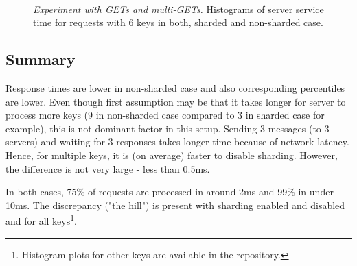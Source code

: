 \documentclass[11pt,a4paper]{article}
\begin{document}
\begin{figure}[ht!]
	\centering	
	\hfill
	\\
	\caption{\textit{Experiment with GETs and multi-GETs.} Histograms of server service time for requests with 6 keys in both, sharded and non-sharded case.}
	\label{Figure:histograms_sst}	
\end{figure}

\subsection{Summary}

Response times are lower in non-sharded case and also corresponding percentiles are lower. Even though first assumption may be that it takes longer for server to process more keys (9 in non-sharded case compared to 3 in sharded case for example), this is not dominant factor in this setup. Sending 3 messages (to 3 servers) and waiting for 3 responses takes longer time because of network latency. Hence, for multiple keys, it is (on average) faster to disable sharding. However, the difference is not very large - less than 0.5ms. 

In both cases, 75\% of requests are processed in around 2ms and 99\% in under 10ms. The discrepancy ("the hill") is present with sharding enabled and disabled and for all keys\footnote{Histogram plots for other keys are available in the repository.}.
\end{document}

